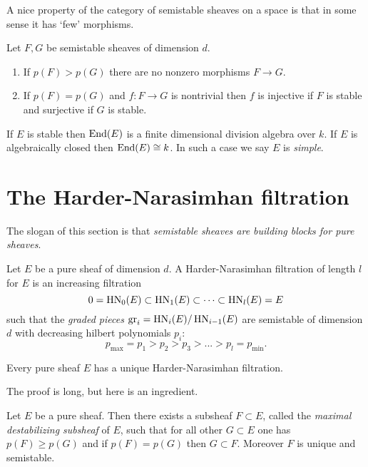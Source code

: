 A nice property of the category of semistable sheaves on a space is that in some sense it has `few' morphisms.
\begin{proposition}
	Let $F, G$ be semistable sheaves of dimension $d$. 
	\begin{enumerate}[label=(\roman*)]
    	\item If $p(F) > p(G)$ there are no nonzero morphisms $F \to G$.
		\item If $p(F) = p(G)$ and $f: F \to G$ is nontrivial then $f$ is injective if $F$ is stable and surjective if $G$ is stable.
    \end{enumerate}
\end{proposition}

\begin{corollary}
	If $E$ is stable then $\operatorname{End}(E)$ is a finite dimensional division algebra over $k$. If $E$ is algebraically closed then $\operatorname{End}(E) \cong k$. In such a case we say $E$ is \emph{simple}.
\end{corollary}

\section{The Harder-Narasimhan filtration}
The slogan of this section is that \emph{semistable sheaves are building blocks for pure sheaves}.
\begin{definition}
	Let $E$ be a pure sheaf of dimension $d$. A Harder-Narasimhan filtration of length $l$ for $E$ is an increasing filtration \[
    	0 = \operatorname{HN}_0(E) \subset \operatorname{HN}_1(E) \subset \dots \subset \operatorname{HN}_l(E) = E
    \] such that the \emph{graded pieces} $\operatorname{gr}_i = \operatorname{HN}_i(E)/\operatorname{HN}_{i-1}(E)$ are semistable of dimension $d$ with decreasing hilbert polynomials $p_i$: \[
    	 p_{\text{max}} = p_1 > p_2 > p_3 > ... > p_l = p_{\text{min}}.
    \]
\end{definition}

\begin{theorem}
	Every pure sheaf $E$ has a unique Harder-Narasimhan filtration.
\end{theorem}
The proof is long, but here is an ingredient.
\begin{lemma}
	Let $E$ be a pure sheaf. Then there exists a subsheaf $F \subset E$, called the \emph{maximal destabilizing subsheaf} of $E$, such that for all other $G \subset E$ one has $p(F) \geq p(G)$ and if $p(F) = p(G)$ then $G \subset F$. Moreover $F$ is unique and semistable.
\end{lemma}
